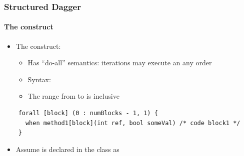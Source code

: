 \begin{frame}[fragile]
  \frametitle{Structured Dagger}
  \framesubtitle{The  construct}
  \begin{itemize}
  \item The  construct:
    \begin{itemize}
    \item Has ``do-all'' semantics: iterations may execute an any order
    \item Syntax: 
    \item The range from  to  is inclusive
    \end{itemize}
  \end{itemize}
  \begin{lstlisting}
    forall [block] (0 : numBlocks - 1, 1) {
      when method1[block](int ref, bool someVal) /* code block1 */
    }
  \end{lstlisting}
  \begin{itemize}
    \item Assume  is declared in the class as 
  \end{itemize}
\end{frame}

%   

%   

%   

%   

%   

